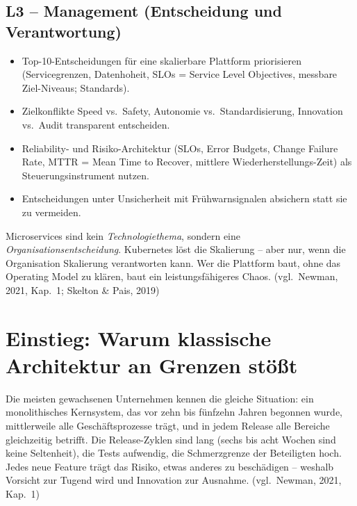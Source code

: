 \documentclass[11pt,a4paper,oneside]{article}
\newcommand{\quelle}[1]{{\footnotesize\color{lpGray}(#1)}}
\begin{document}
\subsection*{L3 -- Management (Entscheidung und Verantwortung)}
\begin{itemize}
  \item Top-10-Entscheidungen für eine skalierbare Plattform priorisieren (Servicegrenzen, Datenhoheit, SLOs = Service Level Objectives, messbare Ziel-Niveaus; Standards).
  \item Zielkonflikte Speed vs.\ Safety, Autonomie vs.\ Standardisierung, Innovation vs.\ Audit transparent entscheiden.
  \item Reliability- und Risiko-Architektur (SLOs, Error Budgets, Change Failure Rate, MTTR = Mean Time to Recover, mittlere Wieder\-herstellungs-Zeit) als Steuerungsinstrument nutzen.
  \item Entscheidungen unter Unsicherheit mit Frühwarnsignalen absichern statt sie zu vermeiden.
\end{itemize}

\begin{merkbox}
Microservices sind kein \emph{Technologiethema}, sondern eine \emph{Organisationsentscheidung}. Kubernetes löst die Skalierung -- aber nur, wenn die Organisation Skalierung verantworten kann. Wer die Plattform baut, ohne das Operating Model zu klären, baut ein leistungsfähigeres Chaos. \quelle{vgl.\ Newman, 2021, Kap.~1; Skelton \& Pais, 2019}
\end{merkbox}

\clearpage

\section{Einstieg: Warum klassische Architektur an Grenzen stößt}

Die meisten gewachsenen Unternehmen kennen die gleiche Situation: ein monolithisches Kernsystem, das vor zehn bis fünfzehn Jahren begonnen wurde, mittlerweile alle Geschäftsprozesse trägt, und in jedem Release alle Bereiche gleichzeitig betrifft. Die Release-Zyklen sind lang (sechs bis acht Wochen sind keine Seltenheit), die Tests aufwendig, die Schmerzgrenze der Beteiligten hoch. Jedes neue Feature trägt das Risiko, etwas anderes zu beschädigen -- weshalb Vorsicht zur Tugend wird und Innovation zur Ausnahme. \quelle{vgl.\ Newman, 2021, Kap.~1}
\end{document}
